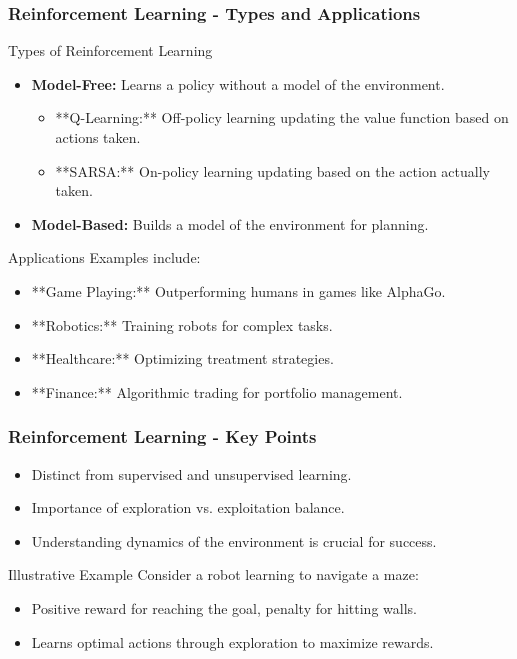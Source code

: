 \documentclass[aspectratio=169]{beamer}
\begin{document}
\begin{frame}[fragile]
  \frametitle{Reinforcement Learning - Types and Applications}
  \begin{block}{Types of Reinforcement Learning}
    \begin{itemize}
      \item \textbf{Model-Free:} Learns a policy without a model of the environment.
        \begin{itemize}
          \item **Q-Learning:** Off-policy learning updating the value function based on actions taken.
          \item **SARSA:** On-policy learning updating based on the action actually taken.
        \end{itemize}
      \item \textbf{Model-Based:} Builds a model of the environment for planning.
    \end{itemize}
  \end{block}
  
  \begin{block}{Applications}
    Examples include:
    \begin{itemize}
      \item **Game Playing:** Outperforming humans in games like AlphaGo.
      \item **Robotics:** Training robots for complex tasks.
      \item **Healthcare:** Optimizing treatment strategies.
      \item **Finance:** Algorithmic trading for portfolio management.
    \end{itemize}
  \end{block}
\end{frame}

\begin{frame}[fragile]
  \frametitle{Reinforcement Learning - Key Points}
  \begin{itemize}
    \item Distinct from supervised and unsupervised learning.
    \item Importance of exploration vs. exploitation balance.
    \item Understanding dynamics of the environment is crucial for success.
  \end{itemize}

  \begin{block}{Illustrative Example}
    Consider a robot learning to navigate a maze:
    \begin{itemize}
      \item Positive reward for reaching the goal, penalty for hitting walls.
      \item Learns optimal actions through exploration to maximize rewards.
    \end{itemize}
  \end{block}
\end{frame}
\end{document}
